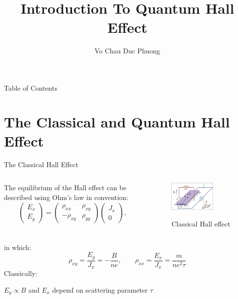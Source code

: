 \documentclass{beamer}
\author{Vo Chau Duc Phuong}
\institute[ICTP]{The Abdus Salam International Center for Theo retical Physics}
\title[Introduction To Quantum Hall Effect]{Introduction To Quantum Hall Effect}
\begin{document}
	\begin{frame}
		\titlepage
	\end{frame}
	\begin{frame}{Table of Contents}
		\tableofcontents
	\end{frame}
	\section{The Classical and Quantum Hall Effect}
\begin{frame}{The Classical Hall Effect}
\begin{columns}
	\begin{column}{0.5\textwidth}
\quad The equilibrium of the Hall effect can be described using Ohm's law in convention:
$$\begin{pmatrix}
	E_x\\E_y
\end{pmatrix}
= \begin{pmatrix}
	\rho_{xx} & \rho_{xy}\\
	-\rho_{xy} & \rho_{yy}
\end{pmatrix}
\begin{pmatrix}
	J_x\\0
\end{pmatrix},$$
	\end{column}
	\begin{column}{0.5\textwidth}
		\begin{figure}
			\centering
\includegraphics[width=0.7\textwidth]{Images/Hall effect.png}
\label{fig: Ohm clas}
\caption{Classical Hall effect}

		\end{figure}
	\end{column}
\end{columns}
\vspace{-0.3cm}in which:
$$	\rho_{xy} = \frac{E_y}{J_x} = -\frac{B}{ne},\qquad
	\rho_{xx} = \frac{E_x}{J_x} = \frac{m}{ne^2 \tau}$$
Classically:
\begin{center}
	\(E_y \propto B\) and \(E_x\) depend on scattering parameter \(\tau\)
\end{center}
\end{frame}
\end{document}
